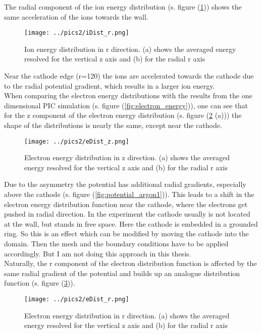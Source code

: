 The radial component of the ion energy distribution (s. figure (\ref{fig:ion_energy_r})) shows the same acceleration of the ions towards the wall.
\begin{figure}[htbp]
    \centering
    \texttt{[image: ../pics2/iDist\_r.png]}
    \caption{Ion energy distribution in r direction. (a) shows the averaged energy resolved for the vertical z axis and (b) for the radial r axis }
    \label{fig:ion_energy_r}
\end{figure}
Near the cathode edge (r=120) the ions are accelerated towards the cathode due to the radial potential gradient, which results in a larger ion energy.\\
When comparing the electron energy distributions with the results from the one dimensional PIC simulation (s. figure (\ref{fig:electron_energy})),
one can see that for the z component of the electron energy distribution (s. figure (\ref{fig:el_energy_z} (a))) the shape of the distributions is nearly the same, except near the cathode.
\begin{figure}[htbp]
    \centering
    \texttt{[image: ../pics2/eDist\_z.png]}
    \caption{Electron energy distribution in z direction. (a) shows the averaged energy resolved for the vertical z axis and (b) for the radial r axis }
    \label{fig:el_energy_z}
\end{figure}
Due to the asymmetry the potential has additional radial gradients, especially above the cathode (s. figure (\ref{fig:potential_argon1})).
This leads to a shift in the electron energy distribution function near the cathode, where the electrons get pushed in radial direction. 
In the experiment the cathode usually is not located at the wall, but stands in free space.
Here the cathode is embedded in a grounded ring.
So this is an effect which can be modified by moving the cathode into the domain.
Then the mesh and the boundary conditions have to be applied accordingly.
But I am not doing this approach in this thesis.\\
Naturally, the r component of the electron distribution function is affected by the same radial gradient of the potential and builds up an analogue distribution function (s. figure (\ref{fig:el_energy_r})).

\begin{figure}[htbp]
    \centering
    \texttt{[image: ../pics2/eDist\_r.png]}
    \caption{Electron energy distribution in r direction. (a) shows the averaged energy resolved for the vertical z axis and (b) for the radial r axis }
    \label{fig:el_energy_r}
\end{figure}

